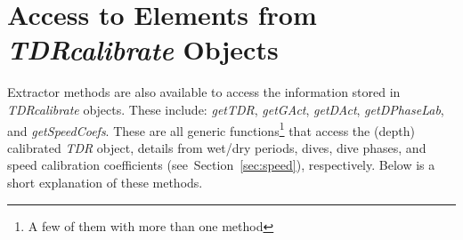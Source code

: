 \documentclass[12pt, letterpaper]{scrartcl}
\newcommand{\Rclass}[1]{{\textit{#1}}}
\newcommand{\Rmethod}[1]{{\textit{#1}}}
\begin{document}
\section{Access to Elements from \Rclass{TDRcalibrate} Objects}
\label{sec:wet-dry}

Extractor methods are also available to access the information stored in
\Rclass{TDRcalibrate} objects.  These include: \Rmethod{getTDR},
\Rmethod{getGAct}, \Rmethod{getDAct}, \Rmethod{getDPhaseLab}, and
\Rmethod{getSpeedCoefs}.  These are all generic functions\footnote{A few
  of them with more than one method} that access the (depth) calibrated
\Rclass{TDR} object, details from wet/dry periods, dives, dive phases, and
speed calibration coefficients (see~Section~\ref{sec:speed}),
respectively.  Below is a short explanation of these methods.
\end{document}
